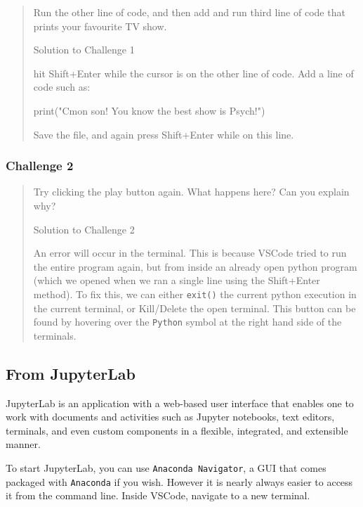 \documentclass[
  letterpaper,
  DIV=11,
  numbers=noendperiod]{scrreprt}
\newenvironment{Shaded}{\begin{snugshade}}{\end{snugshade}}
\newcommand{\BuiltInTok}[1]{\textcolor[rgb]{0.00,0.23,0.31}{#1}}
\newcommand{\NormalTok}[1]{\textcolor[rgb]{0.00,0.23,0.31}{#1}}
\newcommand{\StringTok}[1]{\textcolor[rgb]{0.13,0.47,0.30}{#1}}
\begin{document}
\begin{quote}
Run the other line of code, and then add and run third line of code that
prints your favourite TV show.

Solution to Challenge 1

hit Shift+Enter while the cursor is on the other line of code. Add a
line of code such as:

\begin{Shaded}
\begin{Highlighting}[]
\BuiltInTok{print}\NormalTok{(}\StringTok{"C\textquotesingle{}mon son! You know the best show is Psych!"}\NormalTok{)}
\end{Highlighting}
\end{Shaded}

Save the file, and again press Shift+Enter while on this line.
\end{quote}

\hypertarget{challenge-2}{%
\subsubsection{Challenge 2}\label{challenge-2}}

\begin{quote}
Try clicking the play button again. What happens here? Can you explain
why?

Solution to Challenge 2

An error will occur in the terminal. This is because VSCode tried to run
the entire program again, but from inside an already open python program
(which we opened when we ran a single line using the Shift+Enter
method). To fix this, we can either \texttt{exit()} the current python
execution in the current terminal, or Kill/Delete the open terminal.
This button can be found by hovering over the \texttt{Python} symbol at
the right hand side of the terminals.
\end{quote}

\hypertarget{from-jupyterlab}{%
\subsection{From JupyterLab}\label{from-jupyterlab}}

JupyterLab is an application with a web-based user interface that
enables one to work with documents and activities such as Jupyter
notebooks, text editors, terminals, and even custom components in a
flexible, integrated, and extensible manner.

To start JupyterLab, you can use \texttt{Anaconda\ Navigator}, a GUI
that comes packaged with \texttt{Anaconda} if you wish. However it is
nearly always easier to access it from the command line. Inside VSCode,
navigate to a new terminal.
\end{document}
